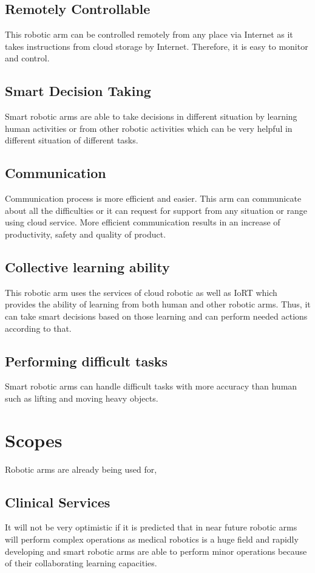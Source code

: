 \documentclass[conference]{IEEEtran}
\begin{document}
\subsection{Remotely Controllable}
This robotic arm can be controlled remotely from any place via Internet as it takes instructions from cloud storage by Internet. Therefore, it is easy to monitor and control.
\subsection{Smart Decision Taking}
Smart robotic arms are able to take decisions in different situation by learning human activities or from other robotic activities which can be very helpful in different situation of different tasks. 
\subsection{Communication}
Communication process is more efficient and easier. This arm can communicate about all the difficulties or it can request for support from any situation or range using cloud service. More efficient communication results in an increase of productivity, safety and quality of product.
\subsection{Collective learning ability}
This robotic arm uses the services of cloud robotic as well as IoRT which provides the ability of learning from both human and other robotic arms. Thus, it can take smart decisions based on those learning and can perform needed actions according to that.
\subsection{Performing difficult tasks}
Smart robotic arms can handle difficult tasks with more accuracy than human such as lifting and moving heavy objects.
\section{Scopes}
Robotic arms are already being used for,

\subsection{Clinical Services}
It will not be very optimistic if it is predicted that in near future robotic arms will perform complex operations as medical robotics is a huge field and rapidly developing and smart robotic arms are able to perform minor operations because of their collaborating learning capacities.
\end{document}

